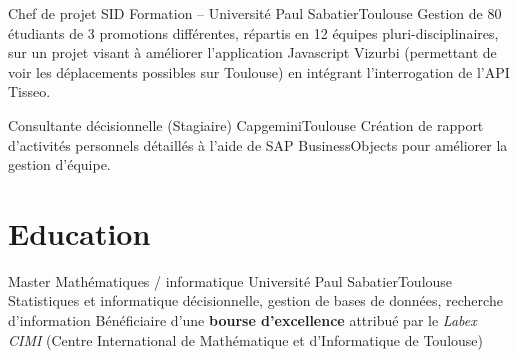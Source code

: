 \documentclass{my_cv_bis}
\begin{document}
	{Chef de projet}
	{SID Formation -- Université Paul Sabatier}{Toulouse}{}
	{Gestion de 80 étudiants de 3 promotions différentes, répartis en 12 équipes pluri-disciplinaires, sur un projet visant à améliorer l'application Javascript Vizurbi (permettant de voir les déplacements possibles sur Toulouse) en intégrant l'interrogation de l'API Tisseo.}
	
	{Consultante décisionnelle {\small\color{gray} (Stagiaire)}}
	{Capgemini}{Toulouse}{}
	{Création de rapport d'activités personnels détaillés à l'aide de SAP BusinessObjects pour améliorer la gestion d'équipe.}
	
%

 
\section{Education}
	{Master Mathématiques / informatique}
	{Université Paul Sabatier}{Toulouse}
	{Statistiques et informatique décisionnelle, gestion de bases de données, recherche d'information}
	{Bénéficiaire d'une \textbf{bourse d'excellence} attribué par le \textit{Labex CIMI} (Centre International de Mathématique et d'Informatique de Toulouse)}
	
%	
%	
	
\end{document}
